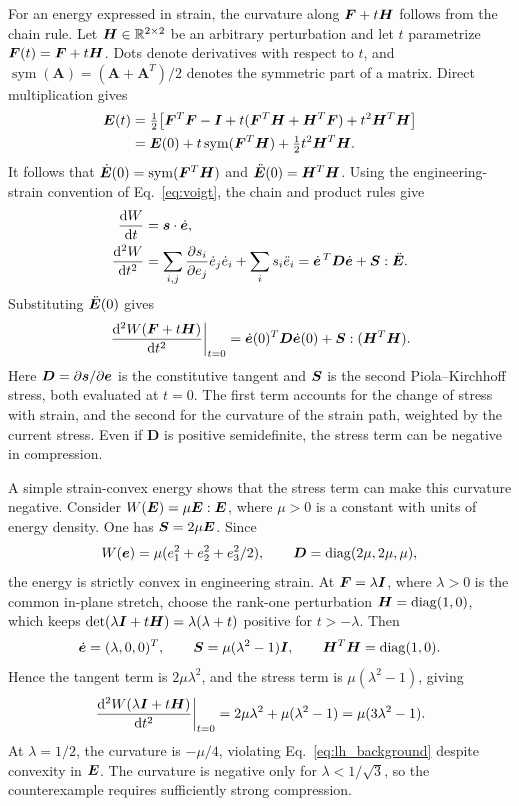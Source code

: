 For an energy expressed in strain, the curvature along $\bm F+t\bm H$ follows from the chain rule. Let $\bm H\in\mathbb R^{2\times2}$ be an arbitrary perturbation and let $t$ parametrize $\bm F(t)=\bm F+t\bm H$. Dots denote derivatives with respect to $t$, and $\operatorname{sym}(\bm A)=(\bm A+\bm A^T)/2$ denotes the symmetric part of a matrix. Direct multiplication gives
\begin{align}
 \bm E(t)
 &=\tfrac12\bigl[\bm F^T\bm F-\bm I
 +t(\bm F^T\bm H+\bm H^T\bm F)+t^2\bm H^T\bm H\bigr]\nonumber\\
 &=\bm E(0)+t\operatorname{sym}(\bm F^T\bm H)
 +\tfrac12t^2\bm H^T\bm H.
\end{align}
It follows that $\dot{\bm E}(0)=\operatorname{sym}(\bm F^T\bm H)$ and $\ddot{\bm E}(0)=\bm H^T\bm H$. Using the engineering-strain convention of Eq.~\eqref{eq:voigt}, the chain and product rules give
\begin{align}
 \frac{\mathrm d W}{\mathrm d t}&=\bm s\cdot\dot{\bm e},\nonumber\\
 \frac{\mathrm d^2 W}{\mathrm d t^2}
 &=\sum_{i,j}\frac{\partial s_i}{\partial e_j}\dot e_j\dot e_i
 +\sum_i s_i\ddot e_i
 =\dot{\bm e}^{\,T}\bm D\dot{\bm e}+\bm S:\ddot{\bm E}.
\end{align}
Substituting $\ddot{\bm E}(0)$ gives
\begin{equation}
 \left.\frac{\mathrm d^2 W(\bm F+t\bm H)}{\mathrm d t^2}\right|_{t=0}
 =\dot{\bm e}(0)^T\bm D\dot{\bm e}(0)+\bm S:(\bm H^T\bm H).
 \label{eq:strain_vs_F_curvature}
\end{equation}
Here $\bm D=\partial\bm s/\partial\bm e$ is the constitutive tangent and $\bm S$ is the second Piola--Kirchhoff stress, both evaluated at $t=0$. The first term accounts for the change of stress with strain, and the second for the curvature of the strain path, weighted by the current stress. Even if $\bm D$ is positive semidefinite, the stress term can be negative in compression.

A simple strain-convex energy shows that the stress term can make this curvature negative. Consider $W(\bm E)=\mu\bm E:\bm E$, where $\mu>0$ is a constant with units of energy density. One has $\bm S=2\mu\bm E$. Since
\begin{equation}
 W(\bm e)=\mu(e_1^2+e_2^2+e_3^2/2),
 \qquad \bm D=\operatorname{diag}(2\mu,2\mu,\mu),
\end{equation}
the energy is strictly convex in engineering strain. At $\bm F=\lambda\bm I$, where $\lambda>0$ is the common in-plane stretch, choose the rank-one perturbation $\bm H=\operatorname{diag}(1,0)$, which keeps $\det(\lambda\bm I+t\bm H)=\lambda(\lambda+t)$ positive for $t>-\lambda$. Then
\begin{equation}
 \dot{\bm e}=(\lambda,0,0)^T,\qquad
 \bm S=\mu(\lambda^2-1)\bm I,\qquad
 \bm H^T\bm H=\operatorname{diag}(1,0).
\end{equation}
Hence the tangent term is $2\mu\lambda^2$, and the stress term is $\mu(\lambda^2-1)$, giving
\begin{equation}
 \left.\frac{\mathrm d^2 W(\lambda\bm I+t\bm H)}{\mathrm d t^2}\right|_{t=0}
 =2\mu\lambda^2+\mu(\lambda^2-1)
 =\mu(3\lambda^2-1).
 \label{eq:strain_convex_counterexample}
\end{equation}
At $\lambda=1/2$, the curvature is $-\mu/4$, violating Eq.~\eqref{eq:lh_background} despite convexity in $\bm E$. The curvature is negative only for $\lambda<1/\sqrt3$, so the counterexample requires sufficiently strong compression.

